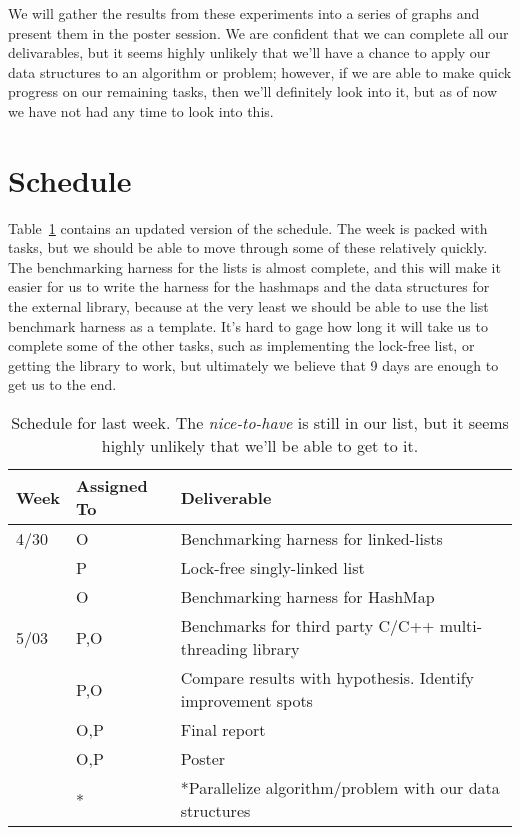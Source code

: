 \documentclass[11pt]{article}
\begin{document}
We will gather the results from these experiments into a series of graphs and
present them in the poster session. We are confident that we can complete all
our delivarables, but it seems highly unlikely that we'll have a chance to apply
our data structures to an algorithm or problem; however, if we are able to make
quick progress on our remaining tasks, then we'll definitely look into it, but
as of now we have not had any time to look into this.

\section*{Schedule}
Table~\ref{table:sche} contains an updated version of the schedule. The week is
packed with tasks, but we should be able to move through some of these
relatively quickly. The benchmarking harness for the lists is almost complete,
and this will make it easier for us to write the harness for the hashmaps and
the data structures for the external library, because at the very least we
should be able to use the list benchmark harness as a template. It's hard to
gage how long it will take us to complete some of the other tasks, such as
implementing the lock-free list, or getting the library to work, but ultimately
we believe that 9 days are enough to get us to the end.

\begin{table}[t]
\begin{center}
\begin{tabular}{lll}
\toprule
\bf Week & \bf Assigned To  & \bf Deliverable   \\
\midrule
4/30     & O     & Benchmarking harness for linked-lists \\
         & P     & Lock-free singly-linked list \\
         & O     & Benchmarking harness for HashMap \\
5/03     & P,O   & Benchmarks for third party C/C++ multi-threading library \\
         & P,O   & Compare results with hypothesis. Identify improvement spots \\
         & O,P   & Final report \\
         & O,P   & Poster \\
         & *     & *Parallelize algorithm/problem with our data structures \\
\bottomrule
\end{tabular}
\caption{
Schedule for last week. The {\it nice-to-have} is still in our list, but it
seems highly unlikely that we'll be able to get to it.
}
\label{table:sche}
\end{center}
\end{table}
\end{document}
